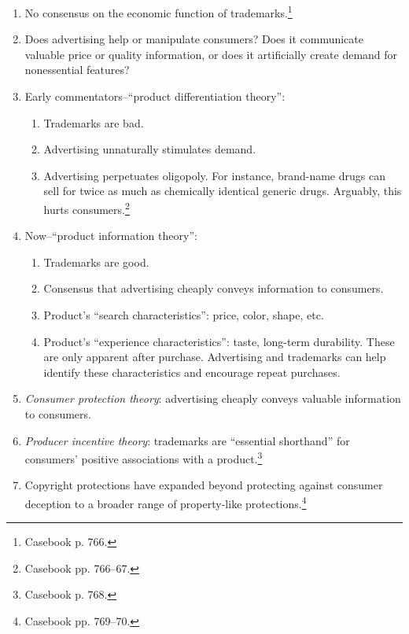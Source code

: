 \begin{enumerate}
    \item No consensus on the economic function of 
    trademarks.\footnote{Casebook p. 766.}
    \item Does advertising help or manipulate consumers? Does it communicate 
    valuable price or quality information, or does it artificially create 
    demand for nonessential features?
    \item Early commentators--``product differentiation theory'':
    \begin{enumerate}
        \item Trademarks are bad.
        \item Advertising unnaturally stimulates demand.
        \item Advertising perpetuates oligopoly. For instance, brand-name 
        drugs can sell for twice as much as chemically identical generic 
        drugs. Arguably, this hurts consumers.\footnote{Casebook pp. 766--67.}
    \end{enumerate}
    \item Now--``product information theory'':
    \begin{enumerate}
        \item Trademarks are good.
        \item Consensus that advertising cheaply conveys information to 
        consumers.
        \item Product's ``search characteristics'': price, color, shape, etc.
        \item Product's ``experience characteristics'': taste, long-term 
        durability. These are only apparent after purchase. Advertising and 
        trademarks can help identify these characteristics and encourage 
        repeat purchases.
    \end{enumerate}
    \item \emph{Consumer protection theory}: advertising cheaply conveys 
    valuable information to consumers.
    \item \emph{Producer incentive theory}: trademarks are ``essential 
    shorthand'' for consumers' positive associations with a 
    product.\footnote{Casebook p. 768.}
    \item Copyright protections have expanded beyond protecting against 
    consumer deception to a broader range of property-like 
    protections.\footnote{Casebook pp. 769--70.}
\end{enumerate}

